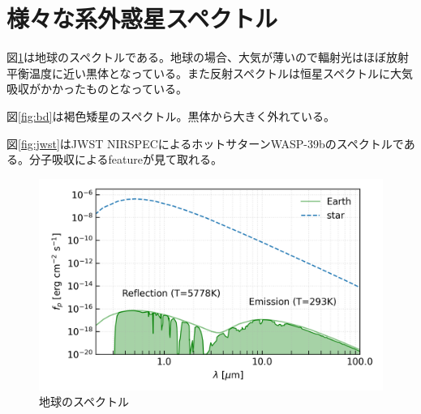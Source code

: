\section{様々な系外惑星スペクトル}



図\ref{fig:earth}は地球のスペクトルである。地球の場合、大気が薄いので輻射光はほぼ放射平衡温度に近い黒体となっている。また反射スペクトルは恒星スペクトルに大気吸収がかかったものとなっている。

図\ref{fig:bd}は褐色矮星のスペクトル。黒体から大きく外れている。

図\ref{fig:jwst}はJWST NIRSPECによるホットサターンWASP-39bのスペクトルである。分子吸収によるfeatureが見て取れる。


\begin{figure}[]
 \begin{center}
	\includegraphics[width=\linewidth]{fig/EarthEmis.png}
\end{center}
	\caption{地球のスペクトル}
	\label{fig:earth}
\end{figure} 

